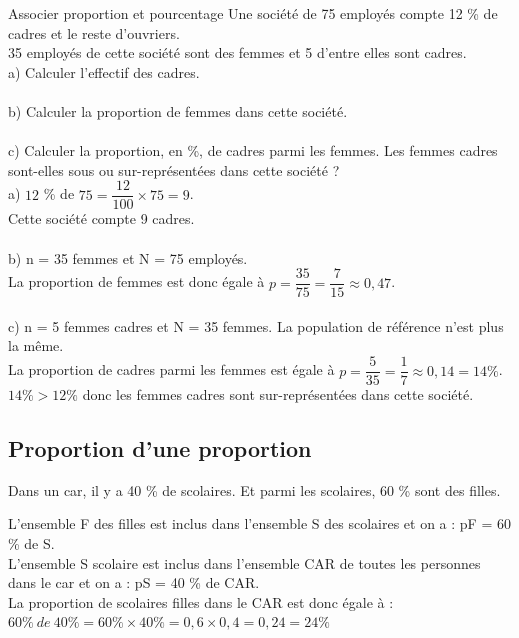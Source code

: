 \begin{methodeTitre}{Associer proportion et pourcentage}
	Une société de 75 employés compte 12 \% de cadres et le reste d'ouvriers.\\
	35 employés de cette société sont des femmes et 5 d'entre elles sont cadres.\\
	a) Calculer l'effectif des cadres.\\
	\\
	b) Calculer la proportion de femmes dans cette société.\\
	\\
	c) Calculer la proportion, en \%, de cadres parmi les femmes. Les femmes cadres sont-elles sous ou sur-représentées dans cette société ?\\
	
	
	
	a) $12$ \% de $75 = \dfrac{12}{100}\times 75 = 9$.\\
	Cette société compte 9 cadres.\\
	\\
	b) n = 35 femmes et N = 75 employés.\\
	La proportion de femmes est donc égale à $p = \dfrac{35}{75} = \dfrac{7}{15} \approx 0,47$.\\
	\\
	c) n = 5 femmes cadres et N = 35 femmes. La population de référence n'est plus la même.\\
	La proportion de cadres parmi les femmes est égale à $p = \dfrac{5}{35} = \dfrac{1}{7} \approx 0,14=14\%$.\\
	$14 \% > 12 \%$ donc les femmes cadres sont sur-représentées dans cette société.
	
\end{methodeTitre}

\subsection{Proportion d'une proportion}

\begin{exemple}
	Dans un car, il y a 40 \% de scolaires. Et parmi les scolaires, 60 \% sont des filles.
\end{exemple}

L'ensemble F des filles est inclus dans l'ensemble S des scolaires et on a : pF = 60 \% de S.\\
L'ensemble S scolaire est inclus dans l'ensemble CAR de toutes les personnes dans le car et on a : pS = 40 \% de CAR.\\
La proportion de scolaires filles dans le CAR est donc égale à :\\ 
$60\%\ de\ 40\% = 60 \% \times 40 \% = 0,6 \times 0,4 = 0,24 = 24 \%$

